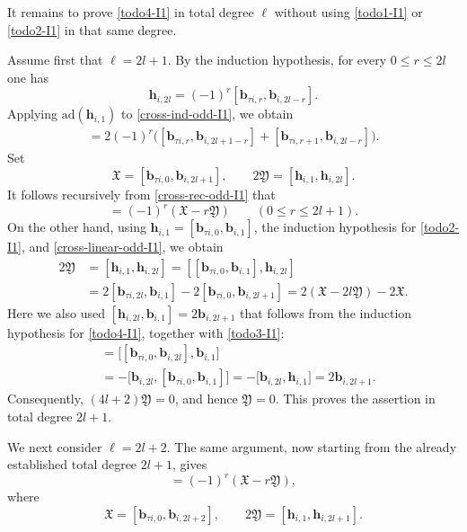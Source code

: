 \documentclass[11pt,reqno]{amsart}
\numberwithin{equation}{section}
\theoremstyle{definition}
\theoremstyle{remark}
\newcommand{\bb}{\mathbf{b}}
\newcommand{\bh}{\mathbf{h}}
\newcommand{\lle}{\leqslant}
\begin{document}
It remains to prove \eqref{todo4-I1} in total degree $\ell$
without using \eqref{todo1-I1} or \eqref{todo2-I1} in that same degree.

Assume first that $\ell=2l+1$. By the induction hypothesis, for every
$0\lle r\lle 2l$ one has
\begin{equation}
\bh_{i,2l}=(-1)^r
[\bb_{\tau i,r},\bb_{i,2l-r}].
\label{cross-ind-odd-I1}
\end{equation}
Applying $\mathrm{ad}(\bh_{i,1})$ to
\eqref{cross-ind-odd-I1}, we obtain
\begin{align}
[\bh_{i,1},\bh_{i,2l}]
=2(-1)^r\big(
[\bb_{\tau i,r},\bb_{i,2l+1-r}]
+[\bb_{\tau i,r+1},\bb_{i,2l-r}]
\big).
\label{cross-rec-odd-I1}
\end{align}
Set
\begin{equation*}
\mathfrak X=[\bb_{\tau i,0},\bb_{i,2l+1}],
\qquad
2\mathfrak Y=[\bh_{i,1},\bh_{i,2l}].
\end{equation*}
It follows recursively from \eqref{cross-rec-odd-I1} that
\begin{equation}
[\bb_{\tau i,r},\bb_{i,2l+1-r}]
=(-1)^r(\mathfrak X-r\mathfrak Y)
\qquad (0\lle r\lle 2l+1).
\label{cross-linear-odd-I1}
\end{equation}
On the other hand, using
$\bh_{i,1}=[\bb_{\tau i,0},\bb_{i,1}]$, the induction hypothesis for
\eqref{todo2-I1}, and \eqref{cross-linear-odd-I1}, we obtain
\begin{align*}
2\mathfrak Y
&=[\bh_{i,1},\bh_{i,2l}]
 =[[\bb_{\tau i,0},\bb_{i,1}],\bh_{i,2l}]
\\
&=2[\bb_{\tau i,2l},\bb_{i,1}]
  -2[\bb_{\tau i,0},\bb_{i,2l+1}]=2(\mathfrak X-2l\mathfrak Y)-2\mathfrak X.
\end{align*}
Here we also used $[\bh_{i,2l},\bb_{i,1}]=2\bb_{i,2l+1}$ that follows from the induction
hypothesis for \eqref{todo4-I1}, together with
\eqref{todo3-I1}:
\begin{align*}
[\bh_{i,2l},\bb_{i,1}]
&=
\big[[\bb_{\tau i,0},\bb_{i,2l}],\bb_{i,1}\big]
\\
&=
-\big[\bb_{i,2l},
      [\bb_{\tau i,0},\bb_{i,1}]\big]
=
-\big[\bb_{i,2l},\bh_{i,1}\big]
=
2\bb_{i,2l+1}.
\end{align*}
Consequently, $(4l+2)\mathfrak Y=0$, and hence
$\mathfrak Y=0$. This proves the assertion in total degree $2l+1$.

We next consider $\ell=2l+2$. The same argument, now starting from the
already established total degree $2l+1$, gives
\begin{equation*}
[\bb_{\tau i,r},\bb_{i,2l+2-r}]
=(-1)^r(\mathfrak X-r\mathfrak Y),
\end{equation*}
where
\begin{equation*}
\mathfrak X=[\bb_{\tau i,0},\bb_{i,2l+2}],
\qquad
2\mathfrak Y=[\bh_{i,1},\bh_{i,2l+1}].
\end{equation*}
\end{document}
